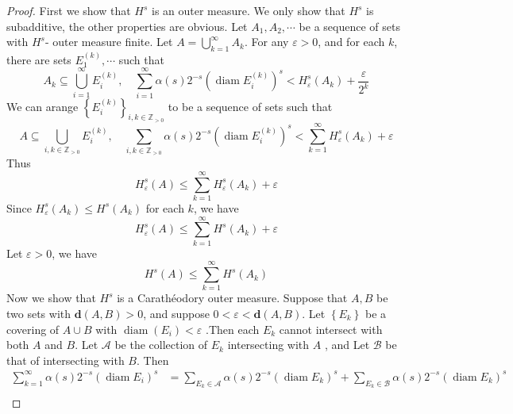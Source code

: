 \documentclass[../main.tex]{subfiles}
\begin{document}
\begin{proof}
    First we show that \(  H^{s}  \)  is an outer measure. We only show that \(  H^{s}  \) is subadditive, the other properties are obvious. Let \(  A_1,A_2,\cdots   \) be a sequence of sets with \(  H^{s}  \)- outer measure finite. Let \(  A= \bigcup _{k = 1}^{\infty}A_{k}  \). For any \(   \varepsilon > 0  \), and for each \(  k  \), there are sets \(  E^{\left( k \right) }_{1},\cdots   \) such that \[
    A_{k}\subseteq  \bigcup _{i = 1}^{\infty}E_{i}^{\left( k \right) },\quad  \sum _{i = 1}^{\infty}\alpha \left( s \right)2^{-s} \left( \operatorname{diam}E_{i}^{\left( k \right) } \right)^{s}< H_{ \varepsilon }^{s}\left( A_{k} \right)+ \frac{ \varepsilon  }{2^{k} } 
    \]       We can arange \(  \left\{ E_{i}^{\left( k \right) } \right\}_{i,k \in \mathbb{Z} _{> 0}}  \) to be a sequence of sets such that  \[
    A\subseteq \bigcup _{i,k \in \mathbb{Z} _{> 0}}E_{i}^{\left( k \right) },\quad  \sum _{i,k \in \mathbb{Z} _{> 0}} \alpha \left( s \right)2^{-s}\left( \operatorname{diam}E_{i}^{\left( k \right) } \right)^{s}< \sum _{k= 1}^{\infty}H_{ \varepsilon }^{s}\left( A_{k} \right)   +  \varepsilon 
    \]  Thus \[
    H_{ \varepsilon }^{s}\left( A \right)\le \sum _{k = 1}^{\infty} H_{ \varepsilon }^{s}\left( A_{k} \right)+  \varepsilon  
    \] Since \(  H_{ \varepsilon }^{s}\left( A_{k} \right)\le  H^{s}\left( A_{k} \right)    \) for each \(  k  \), we have \[
    H_{ \varepsilon }^{s}\left( A \right)\le  \sum _{k = 1}^{\infty}H^{s}\left( A_{k} \right)+  \varepsilon   
    \]   Let \(   \varepsilon > 0  \), we have \[
    H^{s}\left( A \right)\le \sum _{k = 1}^{\infty}H^{s}\left( A_{k} \right)  
    \]
    Now we show that \(  H^{s}  \) is a Carathéodory outer measure. Suppose that \(  A,B  \) be two sets with \(  \mathbf{d}\left( A,B \right)> 0   \), and suppose \(  0<  \varepsilon < \mathbf{d}\left( A,B \right)   \).    
    Let \(  \left\{ E_{k} \right\}  \) be a covering of \(  A\cup B  \)   with \(  \operatorname{diam}\left( E_{i} \right)< \varepsilon    \) .Then each \(  E_{k}  \) cannot intersect with both \(  A  \) and \(  B  \). Let \(  \mathcal{A}  \) be the collection of  \(  E_{k}  \) intersecting with \(  A  \) , and Let \(  \mathcal{B}  \) be that of intersecting with \(  B  \). Then  \[
   \begin{aligned}
    \sum _{k = 1}^{\infty} \alpha \left( s \right)2^{-s}\left( \operatorname{diam}E_{i} \right)^{s}&  = \sum _{ E_{k}\in \mathcal{A}}\alpha \left( s \right)2^{-s} \left( \operatorname{diam}E_{k} \right)^{s} + \sum _{ E_{k}\in \mathcal{B}}\alpha \left( s \right)2^{-s}\left( \operatorname{diam}E_{k} \right)^{s}   \\ 

\end{aligned}\]
\end{proof}
\end{document}
